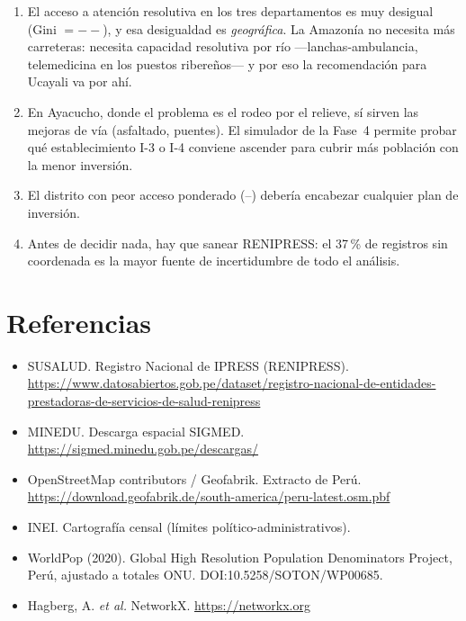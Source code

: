 \documentclass[12pt,a4paper]{article}
\providecommand{\giniTotal}{--}
\providecommand{\peorDistrito}{--}
\begin{document}
\begin{enumerate}
\item El acceso a atenci\'on resolutiva en los tres departamentos es muy
desigual (Gini $=\giniTotal$), y esa desigualdad es \emph{geogr\'afica}. La
Amazon\'ia no necesita m\'as carreteras: necesita capacidad resolutiva por
r\'io ---lanchas-ambulancia, telemedicina en los puestos ribere\~nos--- y
por eso la recomendaci\'on para Ucayali va por ah\'i.
\item En Ayacucho, donde el problema es el rodeo por el relieve, s\'i sirven
las mejoras de v\'ia (asfaltado, puentes). El simulador de la Fase~4 permite
probar qu\'e establecimiento \mbox{I-3} o \mbox{I-4} conviene ascender para
cubrir m\'as poblaci\'on con la menor inversi\'on.
\item El distrito con peor acceso ponderado (\peorDistrito) deber\'ia
encabezar cualquier plan de inversi\'on.
\item Antes de decidir nada, hay que sanear RENIPRESS: el 37\,\% de
registros sin coordenada es la mayor fuente de incertidumbre de todo el
an\'alisis.
\end{enumerate}

\section*{Referencias}
\begin{itemize}
\item SUSALUD. Registro Nacional de IPRESS (RENIPRESS).\\
\url{https://www.datosabiertos.gob.pe/dataset/registro-nacional-de-entidades-prestadoras-de-servicios-de-salud-renipress}
\item MINEDU. Descarga espacial SIGMED. \url{https://sigmed.minedu.gob.pe/descargas/}
\item OpenStreetMap contributors / Geofabrik. Extracto de Per\'u.\\
\url{https://download.geofabrik.de/south-america/peru-latest.osm.pbf}
\item INEI. Cartograf\'ia censal (l\'imites pol\'itico-administrativos).
\item WorldPop (2020). Global High Resolution Population Denominators
Project, Per\'u, ajustado a totales ONU. DOI:10.5258/SOTON/WP00685.
\item Hagberg, A. \emph{et al.} NetworkX. \url{https://networkx.org}
\end{itemize}
\end{document}
